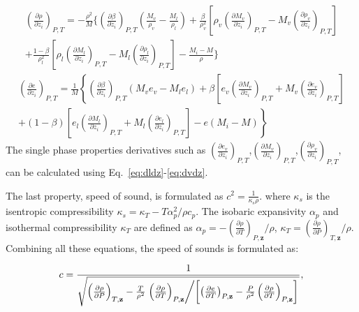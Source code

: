 \begin{align}
\left(\frac{\partial \rho}{\partial z_i} \right)_{P,T}= 
- \frac{\rho^2}{M}\Bigg\{\left(\frac{\partial \beta}{\partial z_i}\right)_{P,T}\left(\frac{M_v}{\rho_v}-\frac{M_l}{\rho_l}\right) + 
\frac{\beta}{\rho_v^2}\left[\rho_v\left(\frac{\partial M_v}{\partial z_i} \right)_{P,T}-M_v \left(\frac{\partial \rho_v}{\partial z_i} \right)_{P,T}\right] \\+
\frac{1-\beta}{\rho_l^2}\left[\rho_l\left(\frac{\partial M_l}{\partial z_i} \right)_{P,T}-M_l \left(\frac{\partial \rho_l}{\partial z_i} \right)_{P,T}\right]- \frac{M_i-M}{\rho}\Bigg\} 
\end{align}
\begin{align}
\left(\frac{\partial e}{\partial z_i}\right)_{P,T}= \frac{1}{M}\left\{ \left(\frac{\partial \beta}{\partial z_i}\right)_{P,T} \left(M_v e_v-M_l e_l\right)+\beta \left[e_v\left(\frac{\partial M_v}{\partial z_i}\right)_{P,T}+M_v\left(\frac{\partial e_v}{\partial z_i}\right)_{P,T}\right]\right.\\ \left.+\left(1-\beta\right)\left[e_l\left(\frac{\partial M_l}{\partial z_i}\right)_{P,T}+M_l\left(\frac{\partial e_l}{\partial z_i}\right)_{P,T}\right] - e \left(M_i-M\right)\right\}
\end{align}
The single phase properties derivatives such as $\left(\frac{\partial e_v}{\partial z_i}\right)_{P,T}$,$\left(\frac{\partial M_v}{\partial z_i}\right)_{P,T}$,$\left(\frac{\partial \rho_v}{\partial z_i} \right)_{P,T}$, can be calculated using Eq.~\ref{eq:dldz}-\ref{eq:dvdz}.


The last property, speed of sound, is formulated as
$c^2 = \frac{1}{\kappa_s\rho}$.
where $\kappa_s$ is the isentropic compressibility $\kappa_s = \kappa_T -T \alpha_p^2/\rho c_p$.  The isobaric expansivity $\alpha_p$ and isothermal compressibility $\kappa_T$ are defined as $\alpha_p=-\left(\frac{\partial \rho}{\partial T}\right)_{P,\mathbf{z}}/\rho$, $\kappa_T=\left(\frac{\partial \rho}{\partial P}\right)_{T,\mathbf{z}}/\rho $.
 Combining all these equations, the speed of sounds is formulated as: 

 \begin{align}
c = \frac{1}{\sqrt{\left(\frac{\partial\rho}{\partial P}\right)_{T,\mathbf{z}} - \frac{T}{\rho^2 } \left.\left(\frac{\partial\rho}{\partial T}\right)_{P,\mathbf{z}} \middle/ \left[\left(\frac{\partial e}{\partial T}\right)_{P,\mathbf{z}}- \frac{P}{\rho^2}\left(\frac{\partial \rho}{\partial T}\right)_{P,\mathbf{z}}\right]\right.}}, \label{eq:soundspeed}
\end{align}

